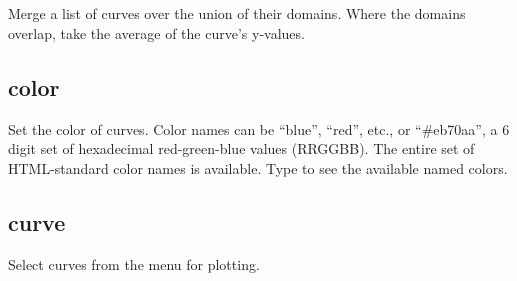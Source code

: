 \documentclass[letterpaper,10pt,english]{sphinxmanual}
\begin{document}
\subsection{}
\label{\detokenize{curve_control_cmds:appendcurves-2-4}}
Merge a list of curves over the union of their domains. Where the domains overlap, take the average of the curve’s y-values.

\begin{sphinxVerbatim}[commandchars=\\\{\}]
\PYG{p}{[}\PYG{p}{]}  
\end{sphinxVerbatim}


\subsection{color}
\label{\detokenize{curve_control_cmds:color}}
Set the color of curves. Color names can be “blue”, “red”, etc., or “\#eb70aa”, a 6 digit set of hexadecimal red-green-blue values (RRGGBB). The entire set of HTML-standard color names is available. Type  to see the available named colors.

\begin{sphinxVerbatim}[commandchars=\\\{\}]
\PYG{p}{[}\PYG{p}{]}   
\end{sphinxVerbatim}


\subsection{curve}
\label{\detokenize{curve_control_cmds:curve}}
Select curves from the menu for plotting. 

\begin{sphinxVerbatim}[commandchars=\\\{\}]
\PYG{p}{[}\PYG{p}{]}  \PYG{p}{[} \PYG{p}{]} 
\end{sphinxVerbatim}
\end{document}
